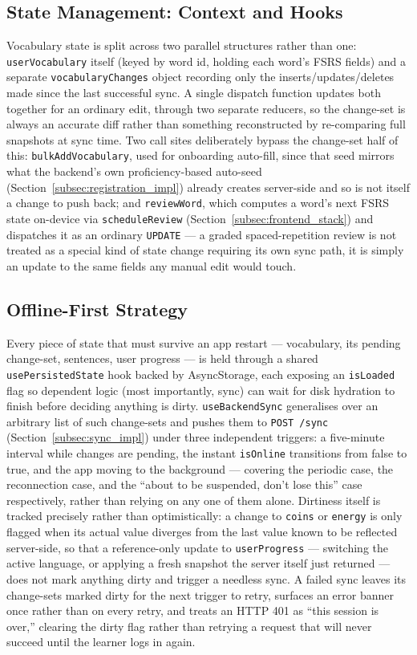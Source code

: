     \subsection{State Management: Context and Hooks}
    \label{subsec:state_mgmt_impl}
    Vocabulary state is split across two parallel structures rather than one: \texttt{userVocabulary} itself (keyed by word id, holding each word's FSRS fields) and a separate \texttt{vocabularyChanges} object recording only the inserts/updates/deletes made since the last successful sync. A single dispatch function updates both together for an ordinary edit, through two separate reducers, so the change-set is always an accurate diff rather than something reconstructed by re-comparing full snapshots at sync time. Two call sites deliberately bypass the change-set half of this: \texttt{bulkAddVocabulary}, used for onboarding auto-fill, since that seed mirrors what the backend's own proficiency-based auto-seed (Section~\ref{subsec:registration_impl}) already creates server-side and so is not itself a change to push back; and \texttt{reviewWord}, which computes a word's next FSRS state on-device via \texttt{scheduleReview} (Section~\ref{subsec:frontend_stack}) and dispatches it as an ordinary \texttt{UPDATE} --- a graded spaced-repetition review is not treated as a special kind of state change requiring its own sync path, it is simply an update to the same fields any manual edit would touch.

    \subsection{Offline-First Strategy}
    \label{subsec:offline_impl}
    Every piece of state that must survive an app restart --- vocabulary, its pending change-set, sentences, user progress --- is held through a shared \texttt{usePersistedState} hook backed by AsyncStorage, each exposing an \texttt{isLoaded} flag so dependent logic (most importantly, sync) can wait for disk hydration to finish before deciding anything is dirty. \texttt{useBackendSync} generalises over an arbitrary list of such change-sets and pushes them to \texttt{POST /sync} (Section~\ref{subsec:sync_impl}) under three independent triggers: a five-minute interval while changes are pending, the instant \texttt{isOnline} transitions from false to true, and the app moving to the background --- covering the periodic case, the reconnection case, and the ``about to be suspended, don't lose this'' case respectively, rather than relying on any one of them alone. Dirtiness itself is tracked precisely rather than optimistically: a change to \texttt{coins} or \texttt{energy} is only flagged when its actual value diverges from the last value known to be reflected server-side, so that a reference-only update to \texttt{userProgress} --- switching the active language, or applying a fresh snapshot the server itself just returned --- does not mark anything dirty and trigger a needless sync. A failed sync leaves its change-sets marked dirty for the next trigger to retry, surfaces an error banner once rather than on every retry, and treats an HTTP 401 as ``this session is over,'' clearing the dirty flag rather than retrying a request that will never succeed until the learner logs in again.


